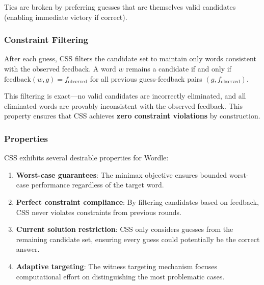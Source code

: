 Ties are broken by preferring guesses that are themselves valid candidates (enabling immediate victory if correct).

\subsubsection{Constraint Filtering}

After each guess, CSS filters the candidate set to maintain only words consistent with the observed feedback. A word $w$ remains a candidate if and only if $\text{feedback}(w, g) = f_{\text{observed}}$ for all previous guess-feedback pairs $(g, f_{\text{observed}})$.

This filtering is exact---no valid candidates are incorrectly eliminated, and all eliminated words are provably inconsistent with the observed feedback. This property ensures that CSS achieves \textbf{zero constraint violations} by construction.

\subsubsection{Properties}

CSS exhibits several desirable properties for Wordle:

\begin{enumerate}
    \item \textbf{Worst-case guarantees}: The minimax objective ensures bounded worst-case performance regardless of the target word.

    \item \textbf{Perfect constraint compliance}: By filtering candidates based on feedback, CSS never violates constraints from previous rounds.

    \item \textbf{Current solution restriction}: CSS only considers guesses from the remaining candidate set, ensuring every guess could potentially be the correct answer.

    \item \textbf{Adaptive targeting}: The witness targeting mechanism focuses computational effort on distinguishing the most problematic cases.
\end{enumerate}

